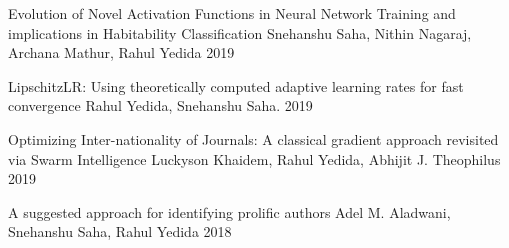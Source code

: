 

\begin{cvhonors}

    \cvhonor
        {Evolution of Novel Activation Functions in Neural Network Training and implications in Habitability Classification}
        {Snehanshu Saha, Nithin Nagaraj, Archana Mathur, Rahul Yedida}
        {}
        {2019}

  \cvhonor
    {LipschitzLR: Using theoretically computed adaptive learning rates for fast convergence}
    {Rahul Yedida, Snehanshu Saha. }
    {} %
    {2019} %


  \cvhonor
    {Optimizing Inter-nationality of Journals: A classical gradient approach revisited via Swarm Intelligence}
    {Luckyson Khaidem, Rahul Yedida, Abhijit J. Theophilus}
    {} %
    {2019} %
    
  \cvhonor
    {A suggested approach for identifying prolific authors}
    {Adel M. Aladwani, Snehanshu Saha, Rahul Yedida}
    {} %
    {2018} %

\end{cvhonors}